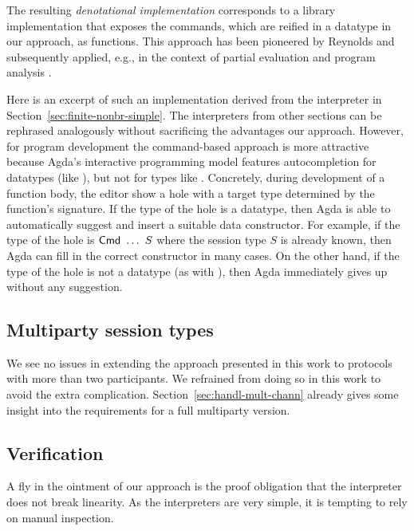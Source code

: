 \documentclass[acmsmall,review,anonymous,screen]{acmart}
\begin{document}
The resulting \emph{denotational implementation} corresponds to a library implementation that exposes
the commands, which are reified in a datatype in our approach, as
functions. This approach has been pioneered by Reynolds \cite{Reynolds1994} and
subsequently applied, e.g., in the context of partial evaluation and
program analysis
\cite{DBLP:journals/jfp/Thiemann99,DBLP:journals/jfp/CaretteKS09}.

Here is an excerpt of such an implementation derived from the
interpreter in Section~\ref{sec:finite-nonbr-simple}.
\stCombinators
The interpreters from other sections can be rephrased analogously
without sacrificing the advantages our approach. However, for program
development the command-based approach is more attractive because 
Agda's interactive programming model features autocompletion for
datatypes (like {\ACommand}), but not for types like {\AXCommand}.
Concretely, during development of a function body, the editor show a
hole with a target type determined by the function's signature. If the
type of the hole is a datatype, then Agda is able to automatically
suggest and insert a suitable data constructor. For example, if the
type of the hole is {$\ACommand\ \dots\ S$} where the session type $S$
is already known, then Agda can fill in the correct constructor in
many cases. On the other hand, if the type of the hole is not a
datatype (as with {\AXCommand}), then Agda
immediately gives up without any suggestion. 

\subsection{Multiparty session types}
\label{sec:mult-sess-types}

We see no issues in extending the approach presented in this work to
protocols with more than two participants. We refrained from doing so
in this work to avoid the extra
complication. Section~\ref{sec:handl-mult-chann} already gives some
insight into the requirements for a full multiparty version.

\subsection{Verification}
\label{sec:verification}

A fly in the ointment of our approach is the proof obligation that
the interpreter does not break linearity. As the interpreters are very
simple, it is tempting to rely on manual inspection.
\end{document}
